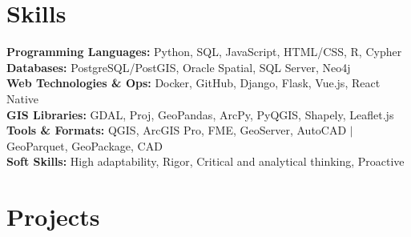 \documentclass[11pt, a4paper]{article}
\begin{document}
\section*{Skills}
\noindent \textbf{Programming Languages:} Python, SQL, JavaScript, HTML/CSS, R, Cypher \\
\textbf{Databases:} PostgreSQL/PostGIS, Oracle Spatial, SQL Server, Neo4j \\
\textbf{Web Technologies \& Ops:} Docker, GitHub, Django, Flask, Vue.js, React Native \\
\textbf{GIS Libraries:} GDAL, Proj, GeoPandas, ArcPy, PyQGIS, Shapely, Leaflet.js \\
\textbf{Tools \& Formats:} QGIS, ArcGIS Pro, FME, GeoServer, AutoCAD $\vert$ GeoParquet, GeoPackage, CAD \\
\textbf{Soft Skills:} High adaptability, Rigor, Critical and analytical thinking, Proactive

\section*{Projects}
\end{document}
